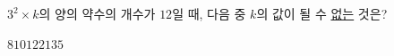 \hspace*{2mm}\begin{minipage}[t]{\dimexpr\linewidth-2mm\relax}\vspace{0pt}
$3^2\times k$의 양의 약수의 개수가 $12$일 때, 다음 중 $k$의 값이 될 수 \underline{없는} 것은?
\begin{choices32}{$8$}{$10$}{$12$}{$21$}{$35$}\end{choices32}\end{minipage}

